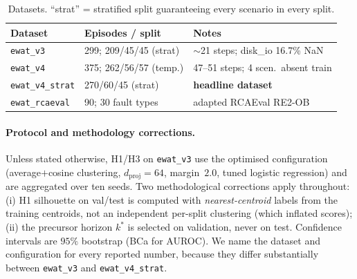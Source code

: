 \begin{table}[t]
\centering
\caption{Datasets. ``strat'' = stratified split guaranteeing every scenario in every split.}
\label{tab:datasets}
\small
\begin{tabularx}{\columnwidth}{@{}lXl@{}}
\toprule
\textbf{Dataset} & \textbf{Episodes / split} & \textbf{Notes} \\
\midrule
\texttt{ewat\_v3}       & 299; 209/45/45 (strat) & $\sim$21 steps; disk\_io 16.7\% NaN \\
\texttt{ewat\_v4}       & 375; 262/56/57 (temp.) & 47--51 steps; 4 scen.\ absent train \\
\texttt{ewat\_v4\_strat}& 270/60/45 (strat)      & \textbf{headline dataset} \\
\texttt{ewat\_rcaeval}  & 90; 30 fault types     & adapted RCAEval RE2-OB \\
\bottomrule
\end{tabularx}
\end{table}

\paragraph{Protocol and methodology corrections.}
Unless stated otherwise, H1/H3 on \texttt{ewat\_v3} use the optimised configuration
(average$+$cosine clustering, $d_{\text{proj}}=64$, margin~$2.0$, tuned logistic regression) and
are aggregated over ten seeds. Two methodological corrections apply throughout: (i) H1 silhouette
on val/test is computed with \emph{nearest-centroid} labels from the training centroids, not an
independent per-split clustering (which inflated scores); (ii) the precursor horizon $k^*$ is
selected on validation, never on test. Confidence intervals are $95\%$ bootstrap (BCa for AUROC).
We name the dataset and configuration for every reported number, because they differ
substantially between \texttt{ewat\_v3} and \texttt{ewat\_v4\_strat}.

